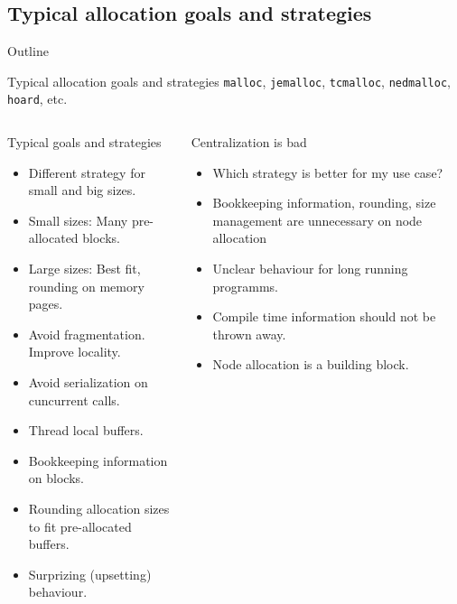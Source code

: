 \documentclass[10pt,aspectratio=169]{beamer}
\begin{document}
\subsection{Typical allocation goals and strategies}

\begin{frame}{Outline}
\end{frame}

\begin{frame}{Typical allocation goals and strategies}
{\texttt{malloc}, \texttt{jemalloc}, \texttt{tcmalloc},
\texttt{nedmalloc}, \texttt{hoard}, etc.}
\begin{columns}
\begin{column}{0.47\textwidth}
\begin{block} {Typical goals and strategies}
\begin{itemize}
\item Different strategy for small and big sizes.
\item Small sizes: Many pre-allocated blocks.
\item Large sizes: Best fit, rounding on memory pages.
\item Avoid fragmentation. Improve locality.
\item Avoid serialization on cuncurrent calls.
\item Thread local buffers.
\item Bookkeeping information on blocks.
\item Rounding allocation sizes to fit pre-allocated buffers.
\item Surprizing (upsetting) behaviour.
\end{itemize}
\end{block}
\end{column}

\begin{column}{0.47\textwidth}
\begin{block} {Centralization is bad}
\begin{itemize}
\item Which strategy is better for my use case?
\item Bookkeeping information, rounding, size management
are unnecessary on node allocation
\item Unclear behaviour for long running programms.
\item Compile time information should not be thrown away.
\item<alert@1> Node allocation is a building block.
\end{itemize}
\end{block}

\end{column}
\end{columns}
\end{frame}
\end{document}
